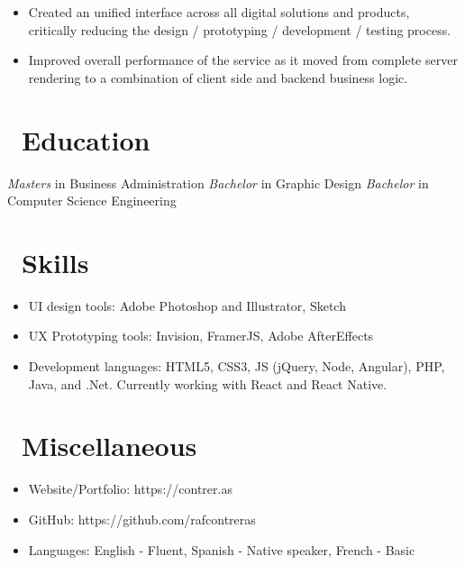 \documentclass{resume}
\begin{document}
\begin{itemize}
  \item Created an unified interface across all digital solutions and products, critically reducing the design / prototyping / development / testing process.
  \item Improved overall performance of the service as it moved from complete server rendering to a combination of client side and backend business logic.
\end{itemize}

\section{\faGraduationCap\ Education}
\textit{Masters} in Business Administration
\textit{Bachelor} in Graphic Design
\textit{Bachelor} in Computer Science Engineering

\section{\faCogs\ Skills}
\begin{itemize}[parsep=0.5ex]
  \item UI design tools: Adobe Photoshop and Illustrator, Sketch
  \item UX Prototyping tools: Invision, FramerJS, Adobe AfterEffects
  \item Development languages: HTML5, CSS3, JS (jQuery, Node, Angular), PHP, Java, and .Net. Currently working with React and React Native.
\end{itemize}

\section{\faInfo\ Miscellaneous}
\begin{itemize}[parsep=0.5ex]
  \item Website/Portfolio: https://contrer.as
  \item GitHub: https://github.com/rafcontreras
  \item Languages: English - Fluent, Spanish - Native speaker, French - Basic
\end{itemize}

%
%
\end{document}
